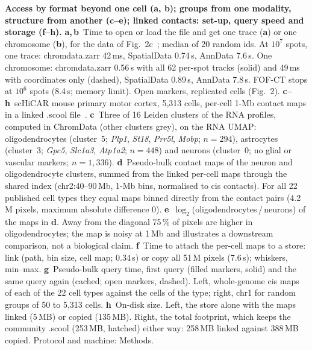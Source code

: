 \textbf{Access by format beyond one cell (a, b); groups from one modality, structure from another (c--e); linked contacts: set-up, query speed and storage (f--h).}
\textbf{a,\,b}~Time to open or load the file and get one trace (\textbf{a}) or one chromosome (\textbf{b}), for the data of Fig.~2c~\citep{takei2025}; median of 20 random ids.
At $10^{7}$ spots, one trace: chromdata.zarr 42\,ms, SpatialData 0.74\,s, AnnData 7.6\,s.
One chromosome: chromdata.zarr 0.56\,s with all 62 per-spot tracks (solid) and 49\,ms with coordinates only (dashed), SpatialData 0.89\,s, AnnData 7.8\,s.
FOF-CT stops at $10^{6}$ spots (8.4\,s; memory limit). Open markers, replicated cells (Fig.~2).
\textbf{c--h}~scHiCAR mouse primary motor cortex, 5,313 cells, per-cell 1-Mb contact maps in a linked .scool file~\citep{schicar}.
\textbf{c}~Three of 16 Leiden clusters of the RNA profiles, computed in ChromData (other clusters grey), on the RNA UMAP: oligodendrocytes (cluster~5; \emph{Plp1}, \emph{St18}, \emph{Prr5l}, \emph{Mobp}; $n=294$), astrocytes (cluster~3; \emph{Gpc5}, \emph{Slc1a3}, \emph{Atp1a2}; $n=448$) and neurons (cluster~0; no glial or vascular markers; $n=1{,}336$).
\textbf{d}~Pseudo-bulk contact maps of the neuron and oligodendrocyte clusters, summed from the linked per-cell maps through the shared index (chr2:40--90\,Mb, 1-Mb bins, normalised to cis contacts).
For all 22 published cell types they equal maps binned directly from the contact pairs (4.2\,M pixels, maximum absolute difference 0).
\textbf{e}~$\log_2$(oligodendrocytes\,/\,neurons) of the maps in \textbf{d}.
Away from the diagonal 75\,\% of pixels are higher in oligodendrocytes; the map is noisy at 1\,Mb and illustrates a downstream comparison, not a biological claim.
\textbf{f}~Time to attach the per-cell maps to a store: link (path, bin size, cell map; 0.34\,s) or copy all 51\,M pixels (7.6\,s); whiskers, min--max.
\textbf{g}~Pseudo-bulk query time, first query (filled markers, solid) and the same query again (cached; open markers, dashed).
Left, whole-genome cis maps of each of the 22 cell types against the cells of the type; right, chr1 for random groups of 50 to 5,313 cells.
\textbf{h}~On-disk size. Left, the store alone with the maps linked (5\,MB) or copied (135\,MB). Right, the total footprint, which keeps the community .scool (253\,MB, hatched) either way: 258\,MB linked against 388\,MB copied.
Protocol and machine: Methods.
